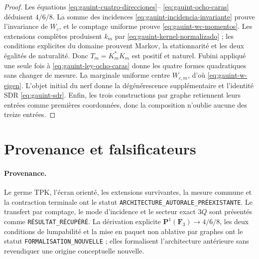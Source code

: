 \begin{proof}
Les équations \eqref{eq:gauint-cuatro-direcciones}--
\eqref{eq:gauint-ocho-caras} déduisent \(4/6/8\). La somme des incidences
\eqref{eq:gauint-incidencia-invariante} prouve l'invariance de \(W_c\), et
le comptage uniforme prouve \eqref{eq:gauint-wc-momentos}. Les extensions
complètes produisent \(k_m\) par \eqref{eq:gauint-kernel-normalizado} ; les
conditions explicites du domaine prouvent Markov, la stationnarité et les deux
égalités de naturalité. Donc \(T_m=K_m^*K_m\) est positif et naturel.
Fubini appliqué une seule fois à \eqref{eq:gauint-ley-ocho-caras} donne les quatre
formes quadratiques sans changer de mesure. La marginale uniforme centre
\(W_{c,m}\), d'où \eqref{eq:gauint-w-eigen}. L'objet initial du nerf
donne la dégénérescence supplémentaire et l'identité SDR \eqref{eq:gauint-sdr}. Enfin,
les trois constructions par graphe retiennent leurs entrées comme premières
coordonnées, donc la composition n'oublie aucune des treize entrées.
\end{proof}

\section{Provenance et falsificateurs}

\paragraph{Provenance.}
Le germe TPK, l'écran orienté, les extensions survivantes, la
mesure commune et la contraction terminale ont le statut
\texttt{ARCHITECTURE\_AUTORALE\_PRÉEXISTANTE}. Le transfert par comptage,
le mode d'incidence et le secteur exact \(3Q\) sont présentés comme
\texttt{RÉSULTAT\_RÉCUPÉRÉ}. La dérivation explicite
\(\mathbf P^1(\mathbf F_3)\to4/6/8\), les deux conditions de lumpabilité et
la mise en paquet non ablative par graphes ont le statut
\texttt{FORMALISATION\_NOUVELLE} ; elles formalisent l'architecture antérieure sans
revendiquer une origine conceptuelle nouvelle.

